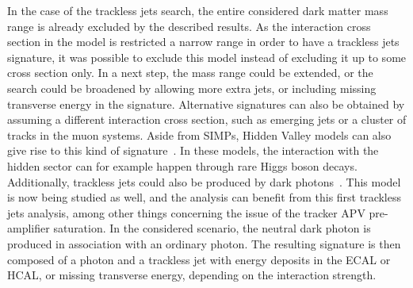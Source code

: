 In the case of the trackless jets search, the entire considered dark matter mass range is already excluded by the described results. As the interaction cross section in the model is restricted a narrow range in order to have a trackless jets signature, it was possible to exclude this model instead of excluding it up to some cross section only. In a next step, the mass range could be extended, or the search could be broadened by allowing more extra jets, or including missing transverse energy in the signature. Alternative signatures can also be obtained by assuming a different interaction cross section, such as emerging jets or a cluster of tracks in the muon systems. Aside from \acp{SIMP}, Hidden Valley models can also give rise to this kind of signature~\cite{Strassler:2006im}. In these models, the interaction with the hidden sector can for example happen through rare Higgs boson decays. Additionally, trackless jets could also be produced by dark photons~\cite{Izaguirre:2015eya}. This model is now being studied as well, and the analysis can benefit from this first trackless jets analysis, among other things concerning the issue of the tracker APV pre-amplifier saturation. In the considered scenario, the neutral dark photon is produced in association with an ordinary photon. The resulting signature is then composed of a photon and a trackless jet with energy deposits in the \ac{ECAL} or \ac{HCAL}, or missing transverse energy, depending on the interaction strength. 



\clearpage{\pagestyle{empty}\cleardoublepage}
